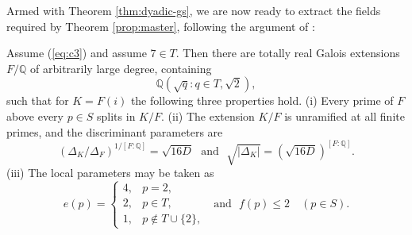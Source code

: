 Armed with Theorem \ref{thm:dyadic-gs}, we are now ready to extract the fields required by Theorem \ref{prop:master}, following the argument of \cite[Lemma 12]{Sawin}:

\begin{proposition}\label{thm:fields}
Assume (\ref{eq:c3}) and assume $7\in T$.  Then there are totally real Galois extensions $F/\mathbb{Q}$ of arbitrarily large degree, containing
\[
   \mathbb{Q}(\sqrt q:q\in T,\sqrt2),
\]
such that for $K=F(i)$ the following three properties hold.  (i) Every prime of $F$ above every $p\in S$ splits in $K/F$.  (ii) The extension $K/F$ is unramified at all finite primes, and the discriminant parameters are
\[
   (\Delta_K/\Delta_F)^{1/[F:\mathbb{Q}]}=\sqrt{16D}
   \ \ \ \text{and}\ \ \
   \sqrt{|\Delta_K|}=(\sqrt{16D})^{[F:\mathbb{Q}]}.
\]
(iii) The local parameters may be taken as
\[
   e(p)=
   \begin{cases}
   4,&p=2,\\
   2,&p\in T,\\
   1,&p\notin T\cup\{2\},
   \end{cases}
   \ \ \ \text{and}\ \ \
   f(p)\leq2\quad(p\in S).
\]
\end{proposition}

